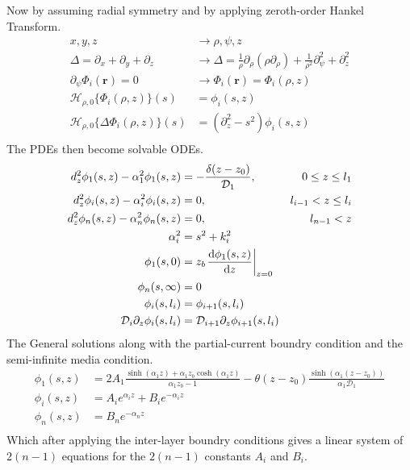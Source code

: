 \documentclass{article}
\newcommand{\diffusion}{\mathcal{D}}
\newcommand{\at}[2]{{\left.{#1}\right|_{#2}}}
\begin{document}
Now by assuming radial symmetry and by applying zeroth-order Hankel Transform.
\begin{align*}
    x, y, z &\rightarrow \rho, \psi, z \\
    \Delta = \partial_x + \partial_y + \partial_z &\rightarrow \Delta = \frac{1}{\rho}\partial_\rho(\rho \partial_\rho) 
    + \frac{1}{\rho^2}\partial^2_\psi + \partial^2_z \\
    \partial_\psi \Phi_i(\mathbf{r}) = 0 &\rightarrow \Phi_i(\mathbf{r}) = \Phi_i(\rho, z) \\
    \mathcal{H}_{\rho, 0}\{{\Phi_i(\rho, z)}\}(s) &= \phi_i(s, z) \\
    \mathcal{H}_{\rho, 0}\{{\Delta\Phi_i(\rho, z)}\}(s) &= (\partial^2_z - s^2)\phi_i(s, z) \\
\end{align*}
The PDEs then become solvable ODEs.
\begin{align*}
    d^2_z\phi_1(s, z) - \alpha_1^2\phi_1(s, z) &= -\frac{\delta(z - z_0)}{\diffusion_1}, & 0 \le z \le l_1 \\
    d^2_z\phi_i(s, z) - \alpha_i^2\phi_i(s, z) &= 0, & l_{i-1} < z \le l_i \\
    d^2_z\phi_n(s, z) - \alpha_n^2\phi_n(s, z) &= 0, & l_{n-1} < z \\
    \alpha_i^2 &= s^2 + k_i^2 \\
    \phi_1(s, 0) &= z_b \at{\diff{\phi_1(s, z)}{z}}{z=0} \\
    \phi_n(s, \infty) &= 0 \\
    \phi_i(s, l_i) &= \phi_{i+1}(s, l_i) \\
    \diffusion_i \partial_z \phi_i(s, l_i) &= \diffusion_{i+1} \partial_z \phi_{i+1}(s, l_i) \\
\end{align*}
The General solutions along with the partial-current boundry condition and the semi-infinite media condition.
\begin{align*}
    \phi_1(s, z) &= 2 A_1 \frac{\sinh(\alpha_1 z) + \alpha_1 z_b \cosh(\alpha_1 z)}{\alpha_1 z_b -1} - \theta(z-z_0)\frac{\sinh(\alpha_1(z-z_0))}{\alpha_1 \diffusion_1}\\
    \phi_i(s, z) &= A_i e^{\alpha_i z} + B_i e^{-\alpha_i z} \\
    \phi_n(s, z) &= B_n e^{-\alpha_n z} \\
\end{align*}
Which after applying the inter-layer boundry conditions gives a linear system of $2(n-1)$ equations for the 
$2(n-1)$ constants $A_i$ and $B_i$.
\end{document}

